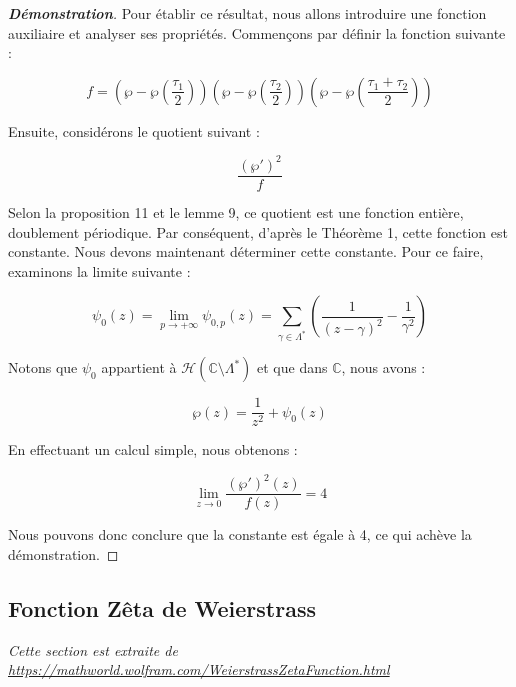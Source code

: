 \documentclass[12pt]{article}
\begin{document}
                        \begin{proof}[\textbf{Démonstration}]
                        
                        Pour établir ce résultat, nous allons introduire une fonction auxiliaire et analyser ses propriétés. Commençons par définir la fonction suivante :
                        
                        \[
                        f = \left( \wp - \wp\left( \frac{\tau_1}{2} \right) \right) \left( \wp - \wp\left( \frac{\tau_2}{2} \right) \right) \left( \wp - \wp\left( \frac{\tau_1 + \tau_2}{2} \right) \right)
                        \]
                        
                        Ensuite, considérons le quotient suivant :
                        
                        \[
                        \frac{(\wp')^2}{f}
                        \]
                        
                        Selon la proposition 11 et le lemme 9, ce quotient est une fonction entière, doublement périodique. Par conséquent, d'après le Théorème 1, cette fonction est constante. Nous devons maintenant déterminer cette constante. Pour ce faire, examinons la limite suivante :
                        
                        \[
                        \psi_0(z) = \lim_{p \to +\infty} \psi_{0,p}(z) = \sum_{\gamma\in \Lambda ^* } \left( \frac{1}{(z - \gamma)^2} - \frac{1}{\gamma^2} \right)
                        \]
                        
                        Notons que $\psi_0$ appartient à $\mathcal{H}(\mathbb{C} \setminus \Lambda^*)$ et que dans $\mathbb{C}$, nous avons :
                        
                        \[
                        \wp(z) = \frac{1}{z^2} + \psi_0(z)
                        \]
                        
                        En effectuant un calcul simple, nous obtenons :
                        
                        \[
                        \lim_{z \to 0} \frac{(\wp')^2(z)}{f(z)} = 4
                        \]
                        
                        Nous pouvons donc conclure que la constante est égale à 4, ce qui achève la démonstration.
                        \end{proof}
                        \subsection{Fonction Zêta de Weierstrass}
                        \textit{Cette section est extraite de \url{https://mathworld.wolfram.com/WeierstrassZetaFunction.html}}
\end{document}
